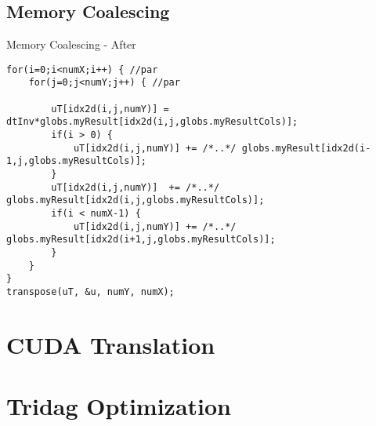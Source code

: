 \documentclass[xcolor=x11names,compress]{beamer}
\begin{document}
\subsection{Memory Coalescing}
\begin{frame}[fragile]{Memory Coalescing - After}
\begin{verbatim}
for(i=0;i<numX;i++) { //par
    for(j=0;j<numY;j++) { //par

        uT[idx2d(i,j,numY)] = dtInv*globs.myResult[idx2d(i,j,globs.myResultCols)];
        if(i > 0) {
            uT[idx2d(i,j,numY)] += /*..*/ globs.myResult[idx2d(i-1,j,globs.myResultCols)];
        }
        uT[idx2d(i,j,numY)]  += /*..*/ globs.myResult[idx2d(i,j,globs.myResultCols)];
        if(i < numX-1) {
            uT[idx2d(i,j,numY)] += /*..*/ globs.myResult[idx2d(i+1,j,globs.myResultCols)];
        }
    }
}
transpose(uT, &u, numY, numX);
\end{verbatim}
\end{frame}

\section{CUDA Translation}

\section{Tridag Optimization}
\end{document}
